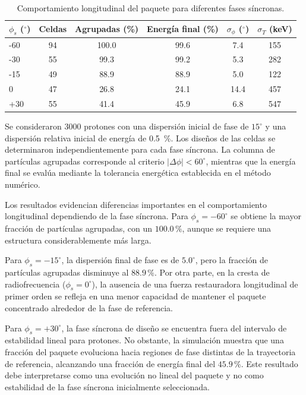 \begin{table}[H]
\centering
\caption{Comportamiento longitudinal del paquete para diferentes fases síncronas.}
\label{tab:estabilidad}
\small
\begin{tabular}{lccccc}
\toprule
$\phi_s$ ($^\circ$) &
Celdas &
Agrupadas (\%) &
Energía final (\%) &
$\sigma_\phi$ ($^\circ$) &
$\sigma_T$ (keV) \\
\midrule
-60 & 94 & 100.0 & 99.6 & 7.4 & 155 \\
-30 & 55 & 99.3 & 99.2 & 5.3 & 282 \\
-15 & 49 & 88.9 & 88.9 & 5.0 & 122 \\
0   & 47 & 26.8 & 24.1 & 14.4 & 457 \\
+30 & 55 & 41.4 & 45.9 & 6.8 & 547 \\
\bottomrule
\end{tabular}

\smallskip
\begin{minipage}{0.95\linewidth}
\footnotesize
Se consideraron $3000$ protones con una dispersión inicial de fase de $15^\circ$ y una dispersión relativa inicial de energía de \SI{0.5}{\percent}. Los diseños de las celdas se determinaron independientemente para cada fase síncrona. La columna de partículas agrupadas corresponde al criterio $|\Delta\phi|<60^\circ$, mientras que la energía final se evalúa mediante la tolerancia energética establecida en el método numérico.
\end{minipage}
\end{table}

Los resultados evidencian diferencias importantes en el comportamiento longitudinal dependiendo de la fase síncrona. Para $\phi_s=-60^\circ$ se obtiene la mayor fracción de partículas agrupadas, con un $100.0\,\%$, aunque se requiere una estructura considerablemente más larga.

Para $\phi_s=-15^\circ$, la dispersión final de fase es de $5.0^\circ$, pero la fracción de partículas agrupadas disminuye al $88.9\,\%$. Por otra parte, en la cresta de radiofrecuencia ($\phi_s=0^\circ$), la ausencia de una fuerza restauradora longitudinal de primer orden se refleja en una menor capacidad de mantener el paquete concentrado alrededor de la fase de referencia.

Para $\phi_s=+30^\circ$, la fase síncrona de diseño se encuentra fuera del intervalo de estabilidad lineal para protones. No obstante, la simulación muestra que una fracción del paquete evoluciona hacia regiones de fase distintas de la trayectoria de referencia, alcanzando una fracción de energía final del $45.9\,\%$. Este resultado debe interpretarse como una evolución no lineal del paquete y no como estabilidad de la fase síncrona inicialmente seleccionada.

